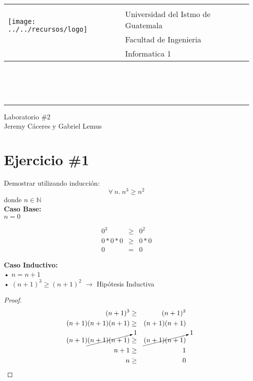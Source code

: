 \documentclass[11pt,letterpaper]{article}
\begin{document}
\begin{tabular}{l l}
\multirow{3}{*}{\texttt{[image: ../../recursos/logo]}} 
 & \\
 & \LARGE Universidad del Istmo de Guatemala \\
 & \LARGE Facultad de Ingenieria \\
 & \LARGE Informatica 1 \\
\end{tabular}
\\\\\\

\begin{center}
	\hrule
	\vspace{0.5cm}
	\huge{Laboratorio \#2} \\
	\vspace{0.1cm}
    \Large{Jeremy Cáceres y Gabriel Lemus}\\
    \vspace{0.05cm}
    \hrulefill
\end{center}
\vspace{0.3cm}

\section*{\Large Ejercicio \#1}
\noindent Demostrar utilizando inducción:
\[
        \forall\ n.\ n^3\geq n^2
\]
donde $n\in\mathbb{N}$
\\

\noindent \textbf{\large Caso Base:}\\
\noindent $n=0$

\begin{eqnarray*}
0^3 &\geq& 0^2 \\
0*0*0 &\geq& 0*0 \\
0 &=& 0
\end{eqnarray*}

\vspace{0.1cm}

\noindent \textbf{\large Caso Inductivo:}\\
\noindent • $n=n+1$ \\
\noindent • $(n+1)^3\geq(n+1)^2$ $\rightarrow$ Hipótesis Inductiva \\

\begin{proof}

\begin{eqnarray*}
(n+1)^3&\geq&(n+1)^2\\
(n+1)(n+1)(n+1)&\geq&(n+1)(n+1)\\
(n+1)\cancelto{1}{(n+1)(n+1)}&\geq&\cancelto{1}{(n+1)(n+1)} \\
n+1&\geq& 1\\
n&\geq& 0
\end{eqnarray*}

\end{proof}
\end{document}
